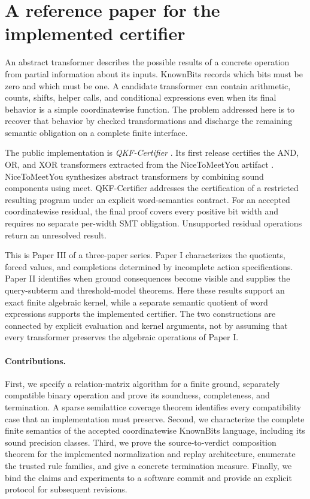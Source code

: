 \section{A reference paper for the implemented certifier}\label{sec:intro}

An abstract transformer describes the possible results of a concrete operation from partial information about its inputs. KnownBits records which bits must be zero and which must be one. A candidate transformer can contain arithmetic, counts, shifts, helper calls, and conditional expressions even when its final behavior is a simple coordinatewise function. The problem addressed here is to recover that behavior by checked transformations and discharge the remaining semantic obligation on a complete finite interface.

The public implementation is \emph{QKF-Certifier} \cite{QKFSoftware}. Its first release certifies the AND, OR, and XOR transformers extracted from the NiceToMeetYou artifact \cite{Peng2026,NTMYArtifact}. NiceToMeetYou synthesizes abstract transformers by combining sound components using meet. QKF-Certifier addresses the certification of a restricted resulting program under an explicit word-semantics contract. For an accepted coordinatewise residual, the final proof covers every positive bit width and requires no separate per-width SMT obligation. Unsupported residual operations return an unresolved result.

This is Paper III of a three-paper series. Paper I \cite{ShcherbakovI} characterizes the quotients, forced values, and completions determined by incomplete action specifications. Paper II \cite{ShcherbakovII} identifies when ground consequences become visible and supplies the query-subterm and threshold-model theorems. Here these results support an exact finite algebraic kernel, while a separate semantic quotient of word expressions supports the implemented certifier. The two constructions are connected by explicit evaluation and kernel arguments, not by assuming that every transformer preserves the algebraic operations of Paper I.

\paragraph{Contributions.}
First, we specify a relation-matrix algorithm for a finite ground, separately compatible binary operation and prove its soundness, completeness, and termination. A sparse semilattice coverage theorem identifies every compatibility case that an implementation must preserve. Second, we characterize the complete finite semantics of the accepted coordinatewise KnownBits language, including its sound precision classes. Third, we prove the source-to-verdict composition theorem for the implemented normalization and replay architecture, enumerate the trusted rule families, and give a concrete termination measure. Finally, we bind the claims and experiments to a software commit and provide an explicit protocol for subsequent revisions.

